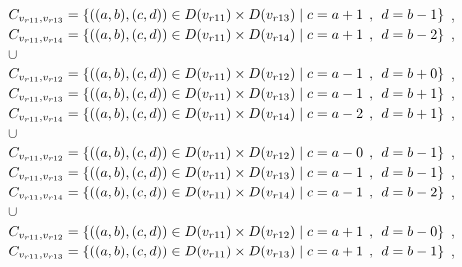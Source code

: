 \\$C_{v_{r11},v_{r13}}=\{((a,b),(c,d))\in D(v_{r11}) \times D(v_{r13})\mid c = a + 1\hspace{1ex} , \hspace{1ex}  d = b - 1 \}$ , 
\\$C_{v_{r11},v_{r14}}=\{((a,b),(c,d))\in D(v_{r11}) \times D(v_{r14})\mid c = a + 1\hspace{1ex} , \hspace{1ex}  d = b - 2 \}$ , 
\\$\cup$
\\$C_{v_{r11},v_{r12}}=\{((a,b),(c,d))\in D(v_{r11}) \times D(v_{r12})\mid c = a - 1\hspace{1ex} , \hspace{1ex}  d = b + 0 \}$ , 
\\$C_{v_{r11},v_{r13}}=\{((a,b),(c,d))\in D(v_{r11}) \times D(v_{r13})\mid c = a - 1\hspace{1ex} , \hspace{1ex}  d = b + 1 \}$ , 
\\$C_{v_{r11},v_{r14}}=\{((a,b),(c,d))\in D(v_{r11}) \times D(v_{r14})\mid c = a - 2\hspace{1ex} , \hspace{1ex}  d = b + 1 \}$ , 
\\$\cup$
\\$C_{v_{r11},v_{r12}}=\{((a,b),(c,d))\in D(v_{r11}) \times D(v_{r12})\mid c = a - 0\hspace{1ex} , \hspace{1ex}  d = b - 1 \}$ , 
\\$C_{v_{r11},v_{r13}}=\{((a,b),(c,d))\in D(v_{r11}) \times D(v_{r13})\mid c = a - 1\hspace{1ex} , \hspace{1ex}  d = b - 1 \}$ , 
\\$C_{v_{r11},v_{r14}}=\{((a,b),(c,d))\in D(v_{r11}) \times D(v_{r14})\mid c = a - 1\hspace{1ex} , \hspace{1ex}  d = b - 2 \}$ , 
\\$\cup$
\\$C_{v_{r11},v_{r12}}=\{((a,b),(c,d))\in D(v_{r11}) \times D(v_{r12})\mid c = a + 1\hspace{1ex} , \hspace{1ex}  d = b - 0 \}$ , 
\\$C_{v_{r11},v_{r13}}=\{((a,b),(c,d))\in D(v_{r11}) \times D(v_{r13})\mid c = a + 1\hspace{1ex} , \hspace{1ex}  d = b - 1 \}$ , 
